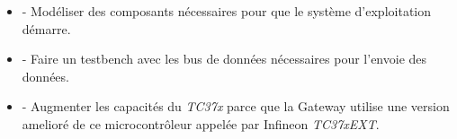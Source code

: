 \begin{itemize} 

    \item - Modéliser des composants nécessaires pour que le système d'exploitation démarre. 

    \item - Faire un testbench avec les bus de donn\'ees nécessaires pour l'envoie des donn\'ees. 

    \item - Augmenter les capacit\'es du \textit{TC37x} parce que la Gateway utilise une version amelior\'e de ce microcontr\^oleur appelée par Infineon \textit{TC37xEXT}\cite{aurix.tc37e}. 

\end{itemize} 
